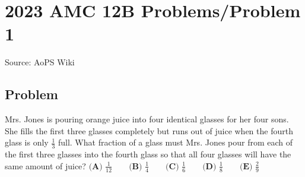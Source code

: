 \documentclass[12pt]{article}
\begin{document}
\section*{{2023 AMC 12B Problems/Problem 1}}
Source: AoPS Wiki

\subsection*{Problem}
Mrs. Jones is pouring orange juice into four identical glasses for her four sons. She fills the first three glasses completely but runs out of juice when the fourth glass is only $\frac{1}{3}$ full. What fraction of a glass must Mrs. Jones pour from each of the first three glasses into the fourth glass so that all four glasses will have the same amount of juice? $\textbf{(A) } \frac{1}{12} \qquad\textbf{(B) } \frac{1}{4} \qquad\textbf{(C) } \frac{1}{6} \qquad\textbf{(D) } \frac{1}{8} \qquad\textbf{(E) } \frac{2}{9}$
\end{document}
